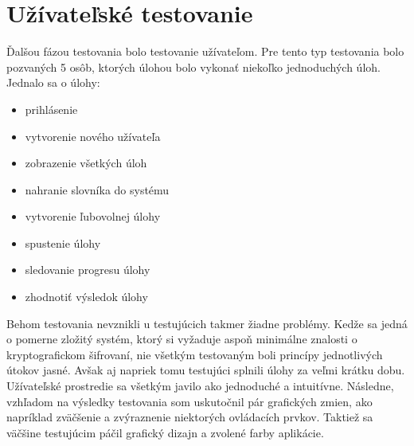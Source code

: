 \documentclass[slovak]{fitthesis}
\begin{document}
\section{Užívateľské testovanie}
Ďalšou fázou testovania bolo testovanie užívateľom. Pre tento typ testovania bolo pozvaných 5 osôb, ktorých úlohou bolo vykonať niekoľko jednoduchých úloh. Jednalo sa o úlohy:
\begin{itemize}
    \item prihlásenie
    \item vytvorenie nového užívateľa
    \item zobrazenie všetkých úloh
    \item nahranie slovníka do systému
    \item vytvorenie ľubovolnej úlohy
    \item spustenie úlohy
    \item sledovanie progresu úlohy
    \item zhodnotiť výsledok úlohy
\end{itemize}
Behom testovania nevznikli u testujúcich takmer žiadne problémy. Kedže sa jedná o pomerne zložitý systém, ktorý si vyžaduje aspoň minimálne znalosti o kryptografickom šifrovaní, nie všetkým testovaným boli princípy jednotlivých útokov jasné. Avšak aj napriek tomu testujúci splnili úlohy za veľmi krátku dobu. Užívateľské prostredie sa všetkým javilo ako jednoduché a intuitívne. Následne, vzhľadom na výsledky testovania som uskutočnil pár grafických zmien, ako napríklad zväčšenie a zvýraznenie niektorých ovládacích prvkov. Taktiež sa väčšine testujúcim páčil grafický dizajn a zvolené farby aplikácie.  
\end{document}
